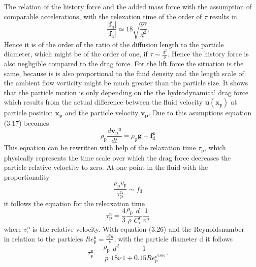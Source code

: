 \documentclass[11pt,a4paper,openany,oneside,parskip=half*]{article}
\renewcommand*\vec[1]{\boldsymbol{#1}}
\begin{document}
The relation of the history force and the added mass force with the assumption of comparable accelerations, with the relexation time of the order of $\tau$ results in
\begin{equation}
\frac{|\vec{f}_\mathrm{h}|}{|\vec{f}_\mathrm{a}|}\simeq 18 \sqrt{\frac{\nu\tau}{d^\mathrm{2}}}.
\end{equation}
Hence it is of the order of the ratio of the diffusion length to the particle diameter, which might be of the order of one, if $\tau \sim \frac{d^\mathrm{2}}{\nu}$.
Hence the history force is also negligible compared to the drag force.
For the lift force the situation is the same, because is is also proportional to the fluid density and the length scale of the ambient flow vorticity might be much greater than the particle size.
It shows that the particle motion is only depending on the the hydrodynamical drag force which results from the actual difference between the fluid velocity $\vec{u}(\vec{x}_\mathrm{p})$ at particle position $\vec{x_p}$ and the particle velocity $\vec{v_p}$.
Due to this asumptions equation (3.17) becomes
\begin{equation}
\rho_\mathrm{p}\frac{d\vec{v_\mathrm{p}}^\mathrm{n}}{dt} = \rho_\mathrm{p}\vec{g}+\vec{f}_\mathrm{d}^\mathrm{n}
\end{equation}
This equation can be rewritten with help of the relaxation time $\tau_\mathrm{p}$, which physically represents the time scale over which the drag force decreases the particle relative veloctity to zero. At one point in the fluid with the proportionality 
\begin{equation}
\frac{\rho_\mathrm{p} v_\mathrm{p}}{\tau_\mathrm{p}^\mathrm{n}} \sim f_\mathrm{d}
\end{equation} it follows the equation for the releaxation time
\begin{equation}
\tau_\mathrm{p}^\mathrm{n} = \frac{4}{3}\frac{\rho_\mathrm{p}}{\rho} \frac{d}{C_\mathrm{d}^\mathrm{n}}\frac{1}{v_\mathrm{r}^\mathrm{n}}
\end{equation}
where $v_\mathrm{r}^\mathrm{n}$ is the relative velocity. 
With equation (3.26) and the Reynoldsnumber in relation to the particles $Re_\mathrm{p}^\mathrm{n}=\frac{v_\mathrm{r}^\mathrm{n}d}{\nu}$, with the particle diameter d it follows
\begin{equation}
\tau_\mathrm{p}^\mathrm{n} = \frac{\rho_\mathrm{p}}{p}\frac{d^2}{18\nu}\frac{1}{1+0.15Re_\mathrm{p}^\mathrm{n^\mathrm{0.687}}}.
\end{equation} 
\end{document}
